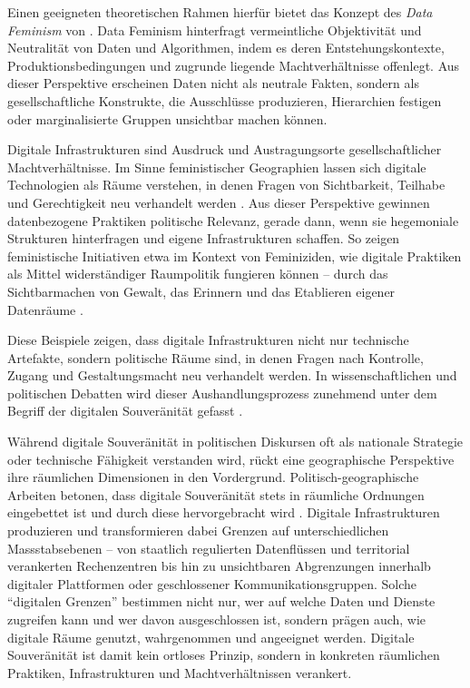 Einen geeigneten theoretischen Rahmen hierfür bietet das Konzept des \textit{Data Feminism} von \textcite{dignazioDataFeminism2020}. Data Feminism hinterfragt vermeintliche Objektivität und Neutralität von Daten und Algorithmen, indem es deren Entstehungskontexte, Produktionsbedingungen und zugrunde liegende Machtverhältnisse offenlegt. Aus dieser Perspektive erscheinen Daten nicht als neutrale Fakten, sondern als gesellschaftliche Konstrukte, die Ausschlüsse produzieren, Hierarchien festigen oder marginalisierte Gruppen unsichtbar machen können.

Digitale Infrastrukturen sind Ausdruck und Austragungsorte gesellschaftlicher Machtverhältnisse. Im Sinne feministischer Geographien lassen sich digitale Technologien als Räume verstehen, in denen Fragen von Sichtbarkeit, Teilhabe und Gerechtigkeit neu verhandelt werden \parencite{elwoodFeministDigitalGeographies2018}. Aus dieser Perspektive gewinnen datenbezogene Praktiken politische Relevanz, gerade dann, wenn sie hegemoniale Strukturen hinterfragen und eigene Infrastrukturen schaffen. So zeigen feministische Initiativen etwa im Kontext von Feminiziden, wie digitale Praktiken als Mittel widerständiger Raumpolitik fungieren können -- durch das Sichtbarmachen von Gewalt, das Erinnern und das Etablieren eigener Datenräume \parencite{dignazioGeographiesMissingData2024}.

Diese Beispiele zeigen, dass digitale Infrastrukturen nicht nur technische Artefakte, sondern politische Räume sind, in denen Fragen nach Kontrolle, Zugang und Gestaltungsmacht neu verhandelt werden. In wissenschaftlichen und politischen Debatten wird dieser Aushandlungsprozess zunehmend unter dem Begriff der digitalen Souveränität gefasst \parencite{glaszeContestedSpatialitiesDigital2023}.

Während digitale Souveränität in politischen Diskursen oft als nationale Strategie oder technische Fähigkeit verstanden wird, rückt eine geographische Perspektive ihre räumlichen Dimensionen in den Vordergrund. Politisch-geographische Arbeiten betonen, dass digitale Souveränität stets in räumliche Ordnungen eingebettet ist und durch diese hervorgebracht wird \parencite{glaszeContestedSpatialitiesDigital2023,zhangBordersBorderingSovereignty2023}. Digitale Infrastrukturen produzieren und transformieren dabei Grenzen auf unterschiedlichen Massstabsebenen -- von staatlich regulierten Datenflüssen und territorial verankerten Rechenzentren bis hin zu unsichtbaren Abgrenzungen innerhalb digitaler Plattformen oder geschlossener Kommunikationsgruppen. Solche \enquote{digitalen Grenzen} bestimmen nicht nur, wer auf welche Daten und Dienste zugreifen kann und wer davon ausgeschlossen ist, sondern prägen auch, wie digitale Räume genutzt, wahrgenommen und angeeignet werden. Digitale Souveränität ist damit kein ortloses Prinzip, sondern in konkreten räumlichen Praktiken, Infrastrukturen und Machtverhältnissen verankert.

